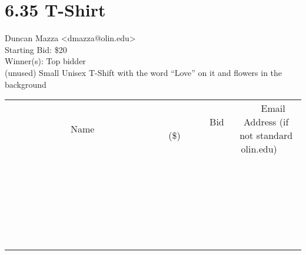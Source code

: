 \documentclass[11pt]{article}
\begin{document}
					\section*{6.35 T-Shirt}
					Duncan Mazza <dmazza@olin.edu> \\
					Starting Bid: \$20 \\
					Winner(s): Top bidder \\
					(unused) Small Unisex T-Shift with the word “Love” on it and flowers in the background \\
					[6ex]
					\begin{tabular}{c c c}
						~~~~~~~~~~~~~Name~~~~~~~~~~~~~ & ~~~~~~~~~Bid (\$)~~~~~~~~~ & ~~~Email Address (if not standard olin.edu)~~~ \\
				
 & & \\
\hline
 & & \\
\hline
 & & \\
\hline
 & & \\
\hline
 & & \\
\hline
 & & \\
\hline
 & & \\
\hline
 & & \\
\hline
 & & \\
\hline
 & & \\
\hline
 & & \\
\hline
 & & \\
\hline
 & & \\
\hline
 & & \\
\hline
 & & \\
\hline
 & & \\
\hline
 & & \\
\hline
 & & \\
\hline
 & & \\
\hline
 & & \\
\hline
 & & \\
\hline
 & & \\
\hline
 & & \\
\hline
 & & \\
\hline
 & & \\
\hline
 & & \\
\hline
					\end{tabular}
					\clearpage
				
\end{document}
